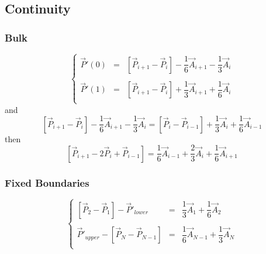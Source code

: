 \documentclass[aps,12pt]{revtex4}
\begin{document}
\subsection{Continuity}

\subsubsection{Bulk}

\begin{equation}
\left\lbrace
\begin{array}{rcl}
	\vec{P}'(0) & = & \left[\vec{P}_{i+1}-\vec{P}_i\right] - \dfrac{1}{6} \vec{A}_{i+1} - \dfrac{1}{3}\vec{A}_{i} \\
	\\
	\vec{P}'(1) & = & \left[\vec{P}_{i+1}-\vec{P}_i\right] + \dfrac{1}{3} \vec{A}_{i+1} + \dfrac{1}{6}\vec{A}_{i}\\
\end{array}
\right.
\end{equation}
and
\begin{equation}
	 \left[\vec{P}_{i+1}-\vec{P}_i\right] - \dfrac{1}{6} \vec{A}_{i+1} - \dfrac{1}{3}\vec{A}_{i}
	 =
	 \left[\vec{P}_{i}-\vec{P}_{i-1}\right] + \dfrac{1}{3} \vec{A}_{i} + \dfrac{1}{6}\vec{A}_{i-1}
\end{equation}
then
\begin{equation}
	 \left[\vec{P}_{i+1}-2\vec{P}_i+\vec{P}_{i-1}\right] = \dfrac{1}{6} \vec{A}_{i-1} + \dfrac{2}{3}\vec{A}_{i} + \dfrac{1}{6} \vec{A}_{i+1}
\end{equation}

\subsubsection{Fixed Boundaries}
 
\begin{equation}
\left\lbrace
\begin{array}{rcl}
 	 \left[\vec{P}_{2}-\vec{P}_1\right] - \vec{P}'_{lower}& = &\dfrac{1}{3} \vec{A}_1 + \dfrac{1}{6} \vec{A}_{2}\\
	 \\
	\vec{P}'_{upper} - \left[\vec{P}_N - \vec{P}_{N-1}\right] & = & \dfrac{1}{6} \vec{A}_{N-1} + \dfrac{1}{3} \vec{A}_{N}\\
\end{array}
\right.
\end{equation}
\end{document}
